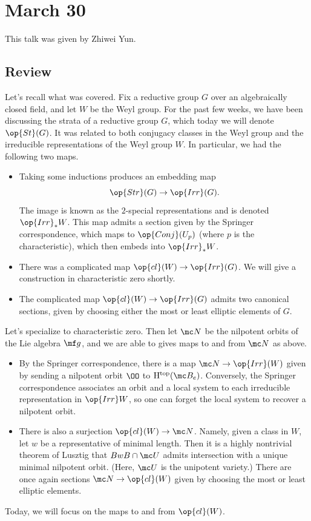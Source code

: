 \documentclass[../notes.tex]{subfiles}
\begin{document}
\section{March 30}
This talk was given by Zhiwei Yun.

\subsection{Review}
Let's recall what was covered. Fix a reductive group $G$ over an algebraically closed field, and let $W$ be the Weyl group. For the past few weeks, we have been discussing the strata of a reductive group $G$, which today we will denote $\op{St}(G)$. It was related to both conjugacy classes in the Weyl group and the irreducible representations of the Weyl group $W$. In particular, we had the following two maps.
\begin{itemize}
	\item Taking some inductions produces an embedding map
	\[\op{Str}(G)\to\op{Irr}(G).\]
	The image is known as the $2$-special representations and is denoted $\op{Irr}_*W$. This map admits a section given by the Springer correspondence, which maps to $\op{Conj}(U_p)$ (where $p$ is the characteristic), which then embeds into $\op{Irr}_*W$.
	\item There was a complicated map $\op{cl}(W)\to\op{Irr}(G)$. We will give a construction in characteristic zero shortly.
	\item The complicated map $\op{cl}(W)\to\op{Irr}(G)$ admits two canonical sections, given by choosing either the most or least elliptic elements of $G$.
\end{itemize}
Let's specialize to characteristic zero. Then let $\mc N$ be the nilpotent orbits of the Lie algebra $\mf g$, and we are able to gives maps to and from $\mc N$ as above.
\begin{itemize}
	\item By the Springer correspondence, there is a map $\mc N\to\op{Irr}(W)$ given by sending a nilpotent orbit $\OO$ to $\mathrm H^{\mathrm{top}}(\mc B_e)$. Conversely, the Springer correspondence associates an orbit and a local system to each irreducible representation in $\op{Irr}W$, so one can forget the local system to recover a nilpotent orbit.
	\item There is also a surjection $\op{cl}(W)\to\mc N$. Namely, given a class in $W$, let $w$ be a representative of minimal length. Then it is a highly nontrivial theorem of Lusztig that $BwB\cap\mc U$ admits intersection with a unique minimal nilpotent orbit. (Here, $\mc U$ is the unipotent variety.) There are once again sections $\mc N\to\op{cl}(W)$ given by choosing the most or least elliptic elements.
\end{itemize}
Today, we will focus on the maps to and from $\op{cl}(W)$.
\end{document}
